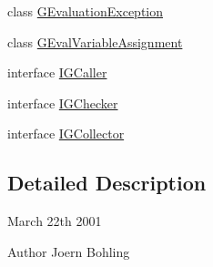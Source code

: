 \begin{DoxyCompactItemize}
\item 
class \hyperlink{classorg_1_1tzi_1_1use_1_1gen_1_1assl_1_1dynamics_1_1_g_evaluation_exception}{G\-Evaluation\-Exception}
\item 
class \hyperlink{classorg_1_1tzi_1_1use_1_1gen_1_1assl_1_1dynamics_1_1_g_eval_variable_assignment}{G\-Eval\-Variable\-Assignment}
\item 
interface \hyperlink{interfaceorg_1_1tzi_1_1use_1_1gen_1_1assl_1_1dynamics_1_1_i_g_caller}{I\-G\-Caller}
\item 
interface \hyperlink{interfaceorg_1_1tzi_1_1use_1_1gen_1_1assl_1_1dynamics_1_1_i_g_checker}{I\-G\-Checker}
\item 
interface \hyperlink{interfaceorg_1_1tzi_1_1use_1_1gen_1_1assl_1_1dynamics_1_1_i_g_collector}{I\-G\-Collector}
\end{DoxyCompactItemize}


\subsection{Detailed Description}
March 22th 2001 \begin{DoxyAuthor}{Author}
Joern Bohling 
\end{DoxyAuthor}
